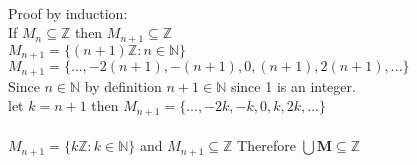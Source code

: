 \documentclass[a4paper,12pt]{article}
\begin{document}
\begin{itemize}
      \\
      Proof by induction:
      \\
      If $M_n \subseteq \mathbb{Z}$ then $M_{n+1} \subseteq \mathbb{Z}$
      \\
      $M_{n+1} = \{(n+1)\mathbb{Z}: n \in \mathbb{N}\}$
      \\
      $M_{n+1} = \{... , -2(n+1), -(n+1), 0, (n+1), 2(n+1), ...\}$
      \\
      Since $n \in \mathbb{N}$ by definition $n+1 \in \mathbb{N}$ since 1 is an integer.
      \\
      let $k=n+1$ then $M_{n+1}=\{...,-2k, -k, 0, k, 2k, ...\}$
      \\
      \\
      $M_{n+1}=\{k\mathbb{Z}: k \in \mathbb{N}\}$ and $M_{n+1}\subseteq \mathbb{Z}$
      Therefore $\bigcup \mathbf{M} \subseteq \mathbb{Z}$
    \end{itemize} 
\end{document}
